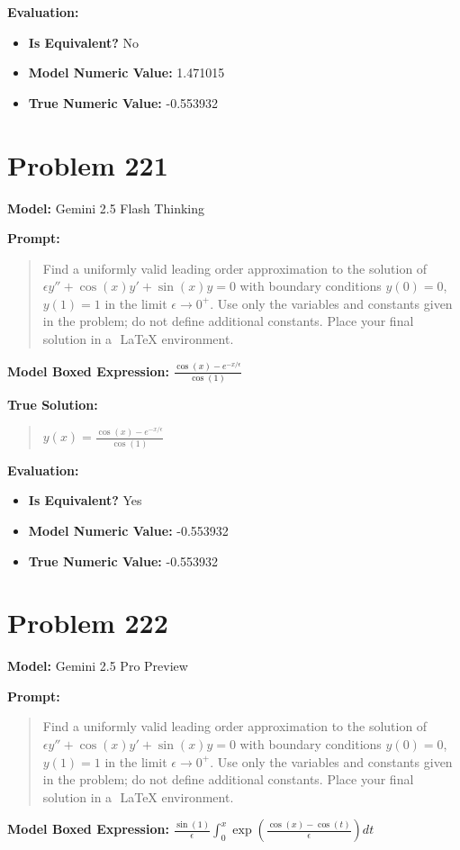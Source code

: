 \documentclass{article}
\begin{document}
{\textbf{Evaluation:}
\begin{itemize}
\item \textbf{Is Equivalent?} No
\item \textbf{Model Numeric Value:} 1.471015
\item \textbf{True Numeric Value:} -0.553932
\end{itemize}
\vspace{1cm}
\section*{Problem 221}
\textbf{Model:} Gemini 2.5 Flash Thinking

\textbf{Prompt:}
\begin{quote}
Find a uniformly valid leading order approximation to the solution of $\epsilon y'' + \cos(x) y ' + \sin(x) y= 0$ with boundary conditions $y(0) = 0$, $y(1)= 1$ in the limit $\epsilon \to 0^+$. Use only the variables and constants given in the problem; do not define additional constants. Place your final solution in a $\boxed{}$ LaTeX environment.
\end{quote}
\textbf{Model Boxed Expression:} $\frac{\cos(x) - e^{-x/\epsilon}}{\cos(1)}$

\textbf{True Solution:}
\begin{quote}
$y(x) = \frac{\cos(x)- e^{-x/\epsilon}}{\cos(1)}$
\end{quote}

\textbf{Evaluation:}
\begin{itemize}
\item \textbf{Is Equivalent?} Yes
\item \textbf{Model Numeric Value:} -0.553932
\item \textbf{True Numeric Value:} -0.553932
\end{itemize}
\vspace{1cm}
\section*{Problem 222}
\textbf{Model:} Gemini 2.5 Pro Preview

\textbf{Prompt:}
\begin{quote}
Find a uniformly valid leading order approximation to the solution of $\epsilon y'' + \cos(x) y ' + \sin(x) y= 0$ with boundary conditions $y(0) = 0$, $y(1)= 1$ in the limit $\epsilon \to 0^+$. Use only the variables and constants given in the problem; do not define additional constants. Place your final solution in a $\boxed{}$ LaTeX environment.
\end{quote}
\textbf{Model Boxed Expression:} $\frac{\sin(1)}{\epsilon} \int_0^x \exp\left(\frac{\cos(x)-\cos(t)}{\epsilon}\right) dt$

}
\end{document}
